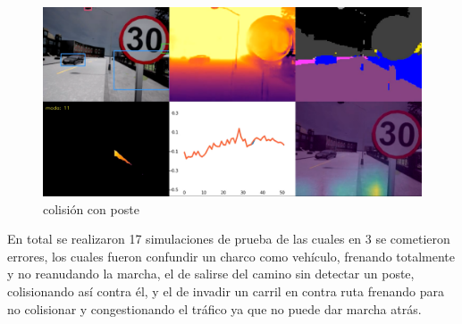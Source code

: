 \begin{figure}[H]
	\centering
	\includegraphics[scale=0.22]{imagenes/preds/crash2}
	\caption[Colisión con Poste]{colisión con poste}
	\label{colision}
\end{figure}

En total se realizaron 17 simulaciones de prueba de las cuales en 3 se cometieron errores, los cuales fueron confundir un charco como vehículo, frenando totalmente y no reanudando la marcha,  el de salirse del camino sin detectar un poste, colisionando así contra él, y el de invadir un carril en contra ruta frenando para no colisionar y congestionando el tráfico ya que no puede dar marcha atrás.